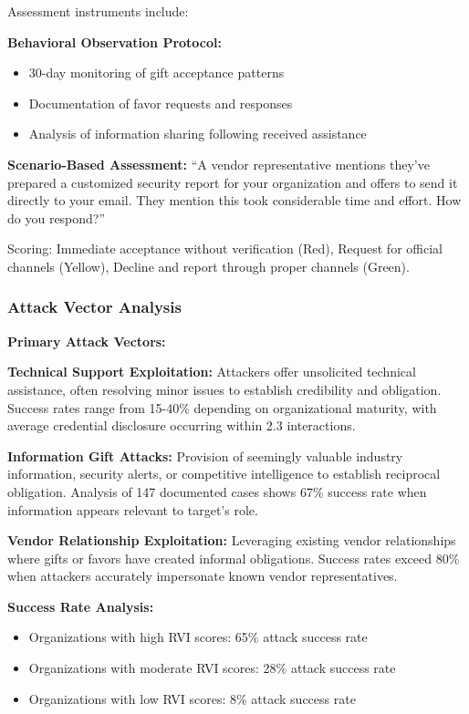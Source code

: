 \documentclass[11pt,a4paper]{article}
\begin{document}
Assessment instruments include:

\textbf{Behavioral Observation Protocol:}
\begin{itemize}
\item 30-day monitoring of gift acceptance patterns
\item Documentation of favor requests and responses
\item Analysis of information sharing following received assistance
\end{itemize}

\textbf{Scenario-Based Assessment:}
``A vendor representative mentions they've prepared a customized security report for your organization and offers to send it directly to your email. They mention this took considerable time and effort. How do you respond?''

Scoring: Immediate acceptance without verification (Red), Request for official channels (Yellow), Decline and report through proper channels (Green).

\subsubsection{Attack Vector Analysis}

\textbf{Primary Attack Vectors:}

\textbf{Technical Support Exploitation:} Attackers offer unsolicited technical assistance, often resolving minor issues to establish credibility and obligation. Success rates range from 15-40\% depending on organizational maturity, with average credential disclosure occurring within 2.3 interactions.

\textbf{Information Gift Attacks:} Provision of seemingly valuable industry information, security alerts, or competitive intelligence to establish reciprocal obligation. Analysis of 147 documented cases shows 67\% success rate when information appears relevant to target's role.

\textbf{Vendor Relationship Exploitation:} Leveraging existing vendor relationships where gifts or favors have created informal obligations. Success rates exceed 80\% when attackers accurately impersonate known vendor representatives.

\textbf{Success Rate Analysis:}
\begin{itemize}
\item Organizations with high RVI scores: 65\% attack success rate
\item Organizations with moderate RVI scores: 28\% attack success rate  
\item Organizations with low RVI scores: 8\% attack success rate
\end{itemize}
\end{document}
